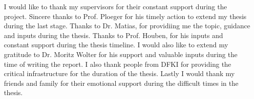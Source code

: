 




    \begin{acknowledgements}
      I would like to thank my supervisors for their constant support during the project.
      Sincere thanks to Prof. Ploeger for his timely action to extend my thesis during the last stage.
      Thanks to Dr. Matias, for providiing me the topic, guidance and inputs during the thesis.
      Thanks to Prof. Houben, for his inputs and constant support during the thesis timeline.
      I would also like to extend my gratitude to Dr. Moritz Wolter for his support and valuable inputs during the time of writing the report.
      I also thank people from DFKI for providing the critical infrastructure for the duration of the thesis.
      Lastly I would thank my friends and family for their emotional support during the difficult times in the thesis.
    \end{acknowledgements}


